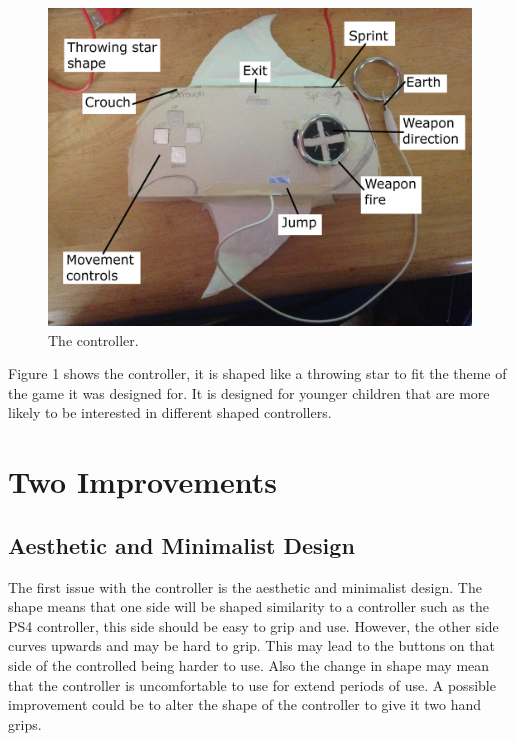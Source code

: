 \documentclass{scrartcl}
\begin{document}
\begin{figure}[h]
	\includegraphics[width=1.0\linewidth]{Controller.jpg}
	\caption{ The controller.}
\end{figure}
Figure 1 shows the controller, it is shaped like a throwing star to fit the theme of the game it was designed for. It is designed for younger children that are more likely to be interested in different shaped controllers.

\section{Two Improvements}
\subsection{ Aesthetic and Minimalist Design}

The first issue with the controller is the aesthetic and minimalist design. The shape means that one side will be shaped similarity to a controller such as the PS4 controller, this side should be easy to grip and use. However, the other side curves upwards and may be hard to grip. This may lead to the buttons on that side of the controlled being harder to use. Also the change in shape may mean that the controller is uncomfortable to use for extend periods of use. A possible improvement could be to alter the shape of the controller to give it two hand grips.
\end{document}
